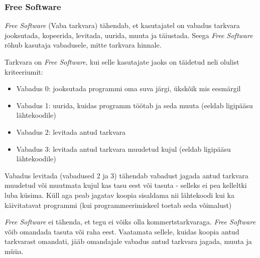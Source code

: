 \documentclass[a4paper,12pt]{article} %
\begin{document}
\subsubsection{Free Software}
\textit{Free Software} (Vaba tarkvara) tähendab, et kasutajatel on vabadus tarkvara jooksutada, kopeerida, levitada, uurida, muuta ja täiustada. Seega \textit{Free Software} rõhub kasutaja vabadusele, mitte tarkvara hinnale. \par
Tarkvara on \textit{Free Software}, kui selle kasutajate jaoks on täidetud neli olulist kriteeriumit:
\begin{itemize}
\item Vabadus 0: jooksutada programmi oma suva järgi, ükskõik mis eesmärgil
\item Vabadus 1: uurida, kuidas programm töötab ja seda muuta (eeldab ligipääsu lähtekoodile)
\item Vabadus 2: levitada antud tarkvara
\item Vabadus 3: levitada antud tarkvara muudetud kujul (eeldab ligipääsu lähtekoodile)
\end{itemize}
Vabadus levitada (vabadused 2 ja 3) tähendab vabadust jagada antud tarkvara muudetud või muutmata kujul kas tasu eest või tasuta - selleks ei pea kelleltki luba küsima. Küll aga peab jagatav koopia sisaldama nii lähtekoodi kui ka käivitatavat programmi (kui programmeerimiskeel toetab seda võimalust)\par
\textit{Free Software} ei tähenda, et tegu ei võiks olla kommertstarkvaraga. \textit{Free Software} võib omandada tasuta või raha eest. Vaatamata sellele, kuidas koopia antud tarkvarast omandati,  jääb omandajale vabadus antud tarkvara jagada, muuta ja müüa.
\cite{GNU_Free_SW}
\end{document}
